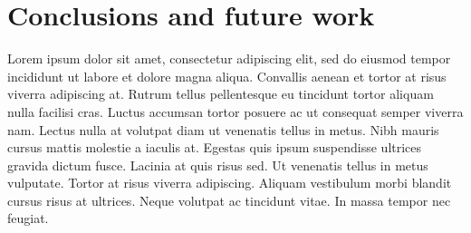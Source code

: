 \chapter{Conclusions and future work}

Lorem ipsum dolor sit amet, consectetur adipiscing elit, sed do eiusmod tempor incididunt ut labore et dolore magna aliqua. Convallis aenean et tortor at risus viverra adipiscing at. Rutrum tellus pellentesque eu tincidunt tortor aliquam nulla facilisi cras. Luctus accumsan tortor posuere ac ut consequat semper viverra nam. Lectus nulla at volutpat diam ut venenatis tellus in metus. Nibh mauris cursus mattis molestie a iaculis at. Egestas quis ipsum suspendisse ultrices gravida dictum fusce. Lacinia at quis risus sed. Ut venenatis tellus in metus vulputate. Tortor at risus viverra adipiscing. Aliquam vestibulum morbi blandit cursus risus at ultrices. Neque volutpat ac tincidunt vitae. In massa tempor nec feugiat.


























